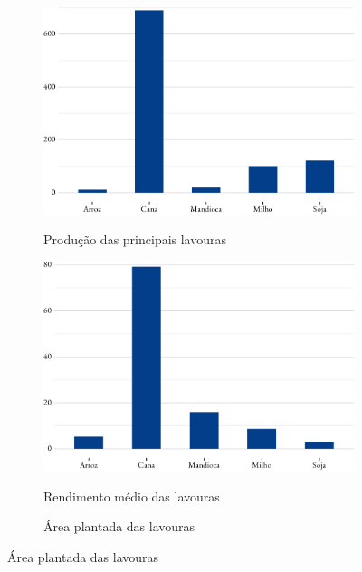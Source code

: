 \begin{figure}[!h]
	\begin{subfigure}{\linewidth}
		\caption{Produção das principais lavouras}
		\includegraphics{fig/producao-1.pdf}
		\label{fig:lavouras}
	\end{subfigure}
	\begin{subfigure}{\linewidth}
		\caption{Rendimento médio das lavouras}
		\includegraphics{fig/rendim_medio-1.pdf}
		\label{fig:rendimento}
	\end{subfigure}
	\begin{subfigure}{\linewidth}
		\caption{Área plantada das lavouras}

\end{subfigure}
\end{figure}
